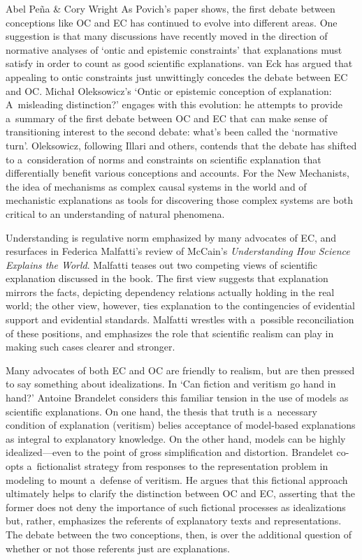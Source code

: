 \begin{editorialeng}{Abel Peña \& Cory Wright}
As Povich's paper shows, the first debate between conceptions like OC and EC has continued to evolve into different areas. One suggestion is that many discussions have recently moved in the direction of normative analyses of `ontic and epistemic constraints' that explanations must satisfy in order to count as good scientific explanations. van Eck
\parencites*[][]{van_eck_reconciling_2015}[][]{wright_ontic_2018}[][]{van_eck_mechanist_2021} %
 has argued that appealing to ontic constraints just unwittingly concedes the debate between EC and OC. Michał Oleksowicz's `Ontic or epistemic conception of explanation: A~misleading distinction?' engages with this evolution: he attempts to provide a~summary of the first debate between OC and EC that can make sense of transitioning interest to the second debate: what's been called the `normative turn'. Oleksowicz, following Illari and others, contends that the debate has shifted to a~consideration of norms and constraints on scientific explanation that differentially benefit various conceptions and accounts. For the New Mechanists, the idea of mechanisms as complex causal systems in the world and of mechanistic explanations as tools for discovering those complex systems are both critical to an understanding of natural phenomena.

Understanding is regulative norm emphasized by many advocates of EC, and resurfaces in Federica Malfatti's review of McCain's \textit{Understanding How Science Explains the World}. Malfatti teases out two competing views of scientific explanation discussed in the book. The first view suggests that explanation mirrors the facts, depicting dependency relations actually holding in the real world; the other view, however, ties explanation to the contingencies of evidential support and evidential standards. Malfatti wrestles with a~possible reconciliation of these positions, and emphasizes the role that scientific realism can play in making such cases clearer and stronger.

Many advocates of both EC and OC are friendly to realism, but are then pressed to say something about idealizations. In `Can fiction and veritism go hand in hand?' Antoine Brandelet considers this familiar tension in the use of models as scientific explanations. On one hand, the thesis that truth is a~necessary condition of explanation (veritism) belies acceptance of model-based explanations as integral to explanatory knowledge. On the other hand, models can be highly idealized---even to the point of gross simplification and distortion. Brandelet co-opts a~fictionalist strategy from responses to the representation problem in modeling to mount a~defense of veritism. He argues that this fictional approach ultimately helps to clarify the distinction between OC and EC, asserting that the former does not deny the importance of such fictional processes as idealizations but, rather, emphasizes the referents of explanatory texts and representations. The debate between the two conceptions, then, is over the additional question of whether or not those referents just are explanations.


\end{editorialeng}
